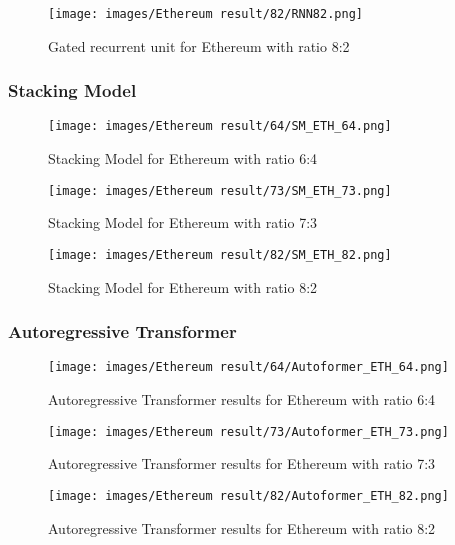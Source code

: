 \documentclass{ieeeojies}
\begin{document}
\begin{figure}[H]
  \centering
\texttt{[image: images/Ethereum result/82/RNN82.png]}\\
  \caption{Gated recurrent unit for Ethereum with ratio 8:2}
  \label{fig:rnn_eth_82}
\end{figure}


\subsubsection{Stacking Model}
\begin{figure}[H]
  \centering
\texttt{[image: images/Ethereum result/64/SM\_ETH\_64.png]}\\
  \caption{Stacking Model for Ethereum with ratio 6:4}
  \label{fig:stackmodel_eth_64}
\end{figure}

\begin{figure}[H]
  \centering
\texttt{[image: images/Ethereum result/73/SM\_ETH\_73.png]}\\
  \caption{Stacking Model for Ethereum with ratio 7:3}
  \label{fig:stackmodel_eth_73}
\end{figure}

\begin{figure}[H]
  \centering
\texttt{[image: images/Ethereum result/82/SM\_ETH\_82.png]}
  \caption{Stacking Model for Ethereum with ratio 8:2}
  \label{fig:stackmodel_eth_82}
\end{figure}

\subsubsection{Autoregressive Transformer}

\begin{figure}[H]
  \centering
\texttt{[image: images/Ethereum result/64/Autoformer\_ETH\_64.png]}
  \caption{Autoregressive Transformer results for Ethereum with ratio 6:4}
  \label{fig:autoformer_eth_64}
\end{figure}
\begin{figure}[H]
  \centering
\texttt{[image: images/Ethereum result/73/Autoformer\_ETH\_73.png]}
  \caption{Autoregressive Transformer results for Ethereum with ratio 7:3}
  \label{fig:autoformer_eth_73}
\end{figure}
\begin{figure}[H]
  \centering
\texttt{[image: images/Ethereum result/82/Autoformer\_ETH\_82.png]}
  \caption{Autoregressive Transformer results for Ethereum with ratio 8:2}
  \label{fig:autoformer_eth_82}
\end{figure}
\end{document}
